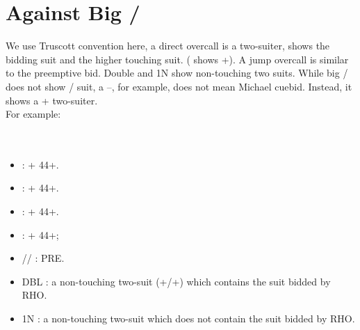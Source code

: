 \documentclass[12pt,twoside,a5paper]{report}%
\begin{document}
\chapter*{Against Big \cl{}/\di{}}
	We use Truscott convention here, a direct overcall is a two-suiter, shows the bidding suit and the higher touching suit. ( shows \sp{}+\cl{}). A jump overcall is similar to the preemptive bid. Double and 1N show non-touching two suits. While big \cl{}/\di{} does not show \cl{}/\di{} suit, a --, for example, does not mean Michael cuebid. Instead, it shows a \cl{}+\di{} two-suiter.\\
	For example:\\
	\\
	\\
	\begin{itemize}
	\renewcommand{\labelitemi}{--}
		\item {} : \di{}+\he{} 44+.
		\item {} : \he{}+\sp{} 44+.
		\item {} : \sp{}+\cl{} 44+.
		\item {} : \cl{}+\di{} 44+;
		\item {}/\he{}/\sp{} : PRE.
		\item DBL : a non-touching two-suit (\he{}+\cl{}/\sp{}+\di{}) which contains the suit bidded by RHO.
		\item 1N : a non-touching two-suit which does not contain the suit bidded by RHO.
	\end{itemize}
\end{document}
